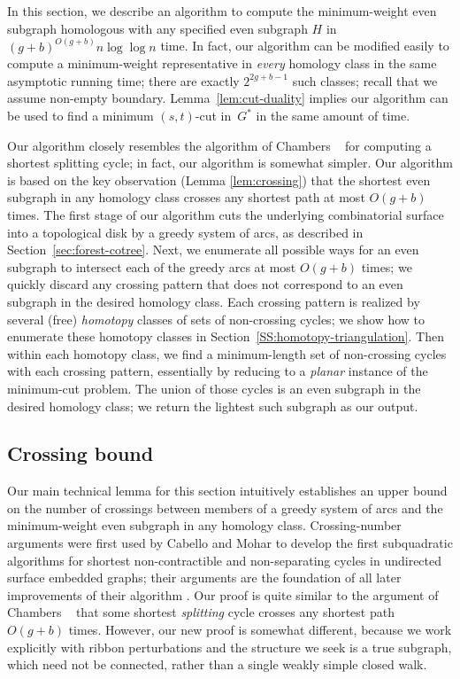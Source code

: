 \documentclass[letterpaper,review]{siamart190516}
\begin{document}
In this section, we describe an
algorithm to compute the minimum-weight even subgraph homologous with any specified even subgraph 
$H$ in $(g+b)^{O(g+b)}n\log \log n$ time.  In fact, our algorithm can be
modified easily to compute a minimum-weight representative in
\emph{every} homology class in the same asymptotic running time;
there are exactly $2^{2g+b-1}$ such classes; recall that we assume non-empty boundary.
Lemma~\ref{lem:cut-duality} implies our algorithm can be used to find a minimum $(s,t)$-cut in~$G^*$ in the same amount of time.

Our algorithm closely resembles the algorithm of Chambers \etal~\cite{ccelw-scsih-08} for computing a shortest splitting cycle; in fact, our algorithm is somewhat simpler.  Our algorithm is based on the key observation (Lemma \ref{lem:crossing})  that the shortest even subgraph in any homology class crosses any shortest path at most $O(g+b)$ times.  The first stage of our algorithm cuts the underlying combinatorial surface into a topological disk by a greedy system of arcs, as described in Section~\ref{sec:forest-cotree}.  Next, we enumerate all possible ways for an even subgraph to intersect each of the greedy arcs at most $O(g+b)$ times; we quickly discard any crossing pattern that does not correspond to an even subgraph in the desired homology class.  Each crossing pattern is realized by several (free) \emph{homotopy} classes of sets of non-crossing cycles; we show how to enumerate these homotopy classes in Section~\ref{SS:homotopy-triangulation}.  Then within each homotopy class, we find a minimum-length set of non-crossing cycles with each crossing pattern, essentially by reducing to a \emph{planar} instance of the minimum-cut problem.  The union of those cycles is an even subgraph in the desired homology class; we return the lightest such subgraph as our output.


\subsection{Crossing bound}
\label{SS:homotopy-crossing}

Our main technical lemma for this section intuitively establishes an upper bound on the number of crossings between members of a greedy system of arcs and the minimum-weight even subgraph in any homology class.  Crossing-number arguments were first used by Cabello and Mohar \cite{cm-fsnsn-07} to develop the first subquadratic algorithms for shortest non-contractible and non-separating cycles in undirected surface embedded graphs; their arguments are the foundation of all later improvements of their algorithm \cite{c-mdpg-06, k-csnco-06, cce-msspe-13}.  Our proof is quite similar to the argument of Chambers \etal~\cite{ccelw-scsih-08} that some shortest \emph{splitting} cycle crosses any shortest path $O(g+b)$ times.  However, our new proof is somewhat different, because we work explicitly with ribbon perturbations and the structure we seek is a true subgraph, which need not be connected, rather than a single weakly simple closed walk.
\end{document}
